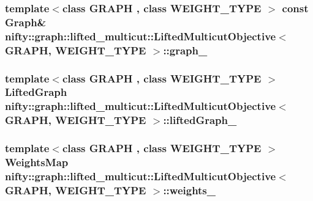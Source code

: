 \subsubsection[{graph\+\_\+}]{\setlength{\rightskip}{0pt plus 5cm}template$<$class G\+R\+A\+P\+H , class W\+E\+I\+G\+H\+T\+\_\+\+T\+Y\+P\+E $>$ const {\bf Graph}\& {\bf nifty\+::graph\+::lifted\+\_\+multicut\+::\+Lifted\+Multicut\+Objective}$<$ G\+R\+A\+P\+H, W\+E\+I\+G\+H\+T\+\_\+\+T\+Y\+P\+E $>$\+::graph\+\_\+\hspace{0.3cm}{\ttfamily [protected]}}\label{classnifty_1_1graph_1_1lifted__multicut_1_1LiftedMulticutObjective_ab1930a04106c5799217149a300d5b2d0}
\hypertarget{classnifty_1_1graph_1_1lifted__multicut_1_1LiftedMulticutObjective_af85f97b9b52b3aa6b71eb8bcccb10b73}{}
\subsubsection[{lifted\+Graph\+\_\+}]{\setlength{\rightskip}{0pt plus 5cm}template$<$class G\+R\+A\+P\+H , class W\+E\+I\+G\+H\+T\+\_\+\+T\+Y\+P\+E $>$ {\bf Lifted\+Graph} {\bf nifty\+::graph\+::lifted\+\_\+multicut\+::\+Lifted\+Multicut\+Objective}$<$ G\+R\+A\+P\+H, W\+E\+I\+G\+H\+T\+\_\+\+T\+Y\+P\+E $>$\+::lifted\+Graph\+\_\+\hspace{0.3cm}{\ttfamily [protected]}}\label{classnifty_1_1graph_1_1lifted__multicut_1_1LiftedMulticutObjective_af85f97b9b52b3aa6b71eb8bcccb10b73}
\hypertarget{classnifty_1_1graph_1_1lifted__multicut_1_1LiftedMulticutObjective_a5ecacadccb40e38448a927a059f3d15e}{}
\subsubsection[{weights\+\_\+}]{\setlength{\rightskip}{0pt plus 5cm}template$<$class G\+R\+A\+P\+H , class W\+E\+I\+G\+H\+T\+\_\+\+T\+Y\+P\+E $>$ {\bf Weights\+Map} {\bf nifty\+::graph\+::lifted\+\_\+multicut\+::\+Lifted\+Multicut\+Objective}$<$ G\+R\+A\+P\+H, W\+E\+I\+G\+H\+T\+\_\+\+T\+Y\+P\+E $>$\+::weights\+\_\+\hspace{0.3cm}{\ttfamily [protected]}}\label{classnifty_1_1graph_1_1lifted__multicut_1_1LiftedMulticutObjective_a5ecacadccb40e38448a927a059f3d15e}


